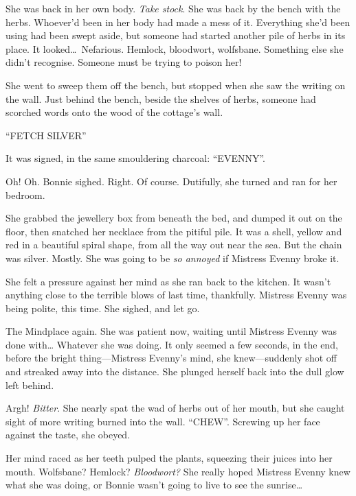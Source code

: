 
She was back in her own body.
\emph{Take stock}.
She was back by the bench with the herbs.
Whoever'd been in her body had made a mess of it.
Everything she'd been using had been swept aside, but someone had started another pile of herbs in its place.
It looked{\dots}\ Nefarious.
Hemlock, bloodwort, wolfsbane.
Something else she didn't recognise.
Someone must be trying to poison her!

She went to sweep them off the bench, but stopped when she saw the writing on the wall.
Just behind the bench, beside the shelves of herbs, someone had scorched words onto the wood of the cottage's wall.

``FETCH SILVER''

It was signed, in the same smouldering charcoal: ``EVENNY''.

Oh!
Oh.
Bonnie sighed.
Right.
Of course.
Dutifully, she turned and ran for her bedroom.

She grabbed the jewellery box from beneath the bed, and dumped it out on the floor, then snatched her necklace from the pitiful pile.
It was a shell, yellow and red in a beautiful spiral shape, from all the way out near the sea.
But the chain was silver.
Mostly.
She was going to be \emph{so annoyed} if Mistress Evenny broke it.

She felt a pressure against her mind as she ran back to the kitchen.
It wasn't anything close to the terrible blows of last time, thankfully.
Mistress Evenny was being polite, this time.
She sighed, and let go.


The Mindplace again.
She was patient now, waiting until Mistress Evenny was done with{\dots} Whatever she was doing.
It only seemed a few seconds, in the end, before the bright thing---Mistress Evenny's mind, she knew---suddenly shot off and streaked away into the distance.
She plunged herself back into the dull glow left behind.


Argh!
\emph{Bitter}.
She nearly spat the wad of herbs out of her mouth, but she caught sight of more writing burned into the wall.
``CHEW''.
Screwing up her face against the taste, she obeyed.

Her mind raced as her teeth pulped the plants, squeezing their juices into her mouth.
Wolfsbane?
Hemlock?
\emph{Bloodwort?}
She really hoped Mistress Evenny knew what she was doing, or Bonnie wasn't going to live to see the sunrise{\dots}

